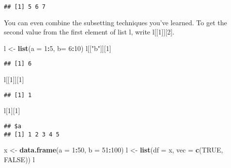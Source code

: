 \documentclass[
]{article}
\newenvironment{Shaded}{\begin{snugshade}}{\end{snugshade}}
\newcommand{\DataTypeTok}[1]{\textcolor[rgb]{0.13,0.29,0.53}{#1}}
\newcommand{\DecValTok}[1]{\textcolor[rgb]{0.00,0.00,0.81}{#1}}
\newcommand{\KeywordTok}[1]{\textcolor[rgb]{0.13,0.29,0.53}{\textbf{#1}}}
\newcommand{\NormalTok}[1]{#1}
\newcommand{\OperatorTok}[1]{\textcolor[rgb]{0.81,0.36,0.00}{\textbf{#1}}}
\newcommand{\OtherTok}[1]{\textcolor[rgb]{0.56,0.35,0.01}{#1}}
\newcommand{\StringTok}[1]{\textcolor[rgb]{0.31,0.60,0.02}{#1}}
\begin{document}
\begin{verbatim}
## [1] 5 6 7
\end{verbatim}

You can even combine the subsetting techniques you've learned. To get
the second value from the first element of list l, write
l{[}{[}1{]}{]}{[}2{]}.

\begin{Shaded}
\begin{Highlighting}[]
\NormalTok{l <-}\StringTok{ }\KeywordTok{list}\NormalTok{(}\DataTypeTok{a =} \DecValTok{1}\OperatorTok{:}\DecValTok{5}\NormalTok{, }\DataTypeTok{b=} \DecValTok{6}\OperatorTok{:}\DecValTok{10}\NormalTok{)}
\NormalTok{l[[}\StringTok{"b"}\NormalTok{]][}\DecValTok{1}\NormalTok{]}
\end{Highlighting}
\end{Shaded}

\begin{verbatim}
## [1] 6
\end{verbatim}

\begin{Shaded}
\begin{Highlighting}[]
\NormalTok{l[[}\DecValTok{1}\NormalTok{]][}\DecValTok{1}\NormalTok{]}
\end{Highlighting}
\end{Shaded}

\begin{verbatim}
## [1] 1
\end{verbatim}

\begin{Shaded}
\begin{Highlighting}[]
\NormalTok{l[}\DecValTok{1}\NormalTok{][}\DecValTok{1}\NormalTok{]}
\end{Highlighting}
\end{Shaded}

\begin{verbatim}
## $a
## [1] 1 2 3 4 5
\end{verbatim}

\begin{Shaded}
\begin{Highlighting}[]
\NormalTok{x <-}\StringTok{ }\KeywordTok{data.frame}\NormalTok{(}\DataTypeTok{a =} \DecValTok{1}\OperatorTok{:}\DecValTok{50}\NormalTok{, }\DataTypeTok{b =} \DecValTok{51}\OperatorTok{:}\DecValTok{100}\NormalTok{)}
\NormalTok{l <-}\StringTok{ }\KeywordTok{list}\NormalTok{(}\DataTypeTok{df =}\NormalTok{ x, }\DataTypeTok{vec =} \KeywordTok{c}\NormalTok{(}\OtherTok{TRUE}\NormalTok{, }\OtherTok{FALSE}\NormalTok{))}
\NormalTok{l}
\end{Highlighting}
\end{Shaded}
\end{document}
